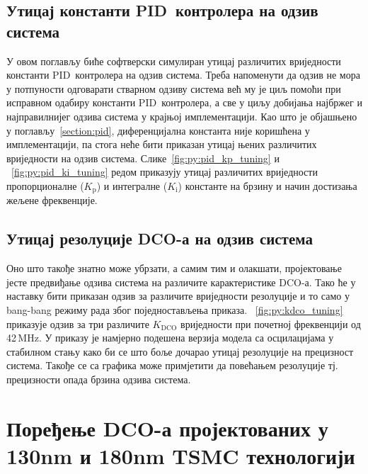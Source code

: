 \documentclass[master]{finthesis}
\def \DCO  {DCO} %
\def \PID  {PID} %
\begin{document}
\subsection{Утицај константи \PID\ контролера на одзив система} \label{section:python_model:pid_tuning}
У овом поглављу биће софтверски симулиран утицај различитих вриједности константи \PID\ контролера на одзив система. Треба напоменути да одзив не мора у потпуности одговарати стварном одзиву система већ му је циљ помоћи при исправном одабиру константи \PID\ контролера, а све у циљу добијања најбржег и најправилнијег одзива система у крајњој имплементацији. Као што је објашњено у поглављу~\ref{section:pid}, диференцијална константа није коришћена у имплементацији, па стога неће бити приказан утицај њених различитих вриједности на одзив система. Слике~\ref{fig:py:pid_kp_tuning} и ~\ref{fig:py:pid_ki_tuning} редом приказују утицај различитих вриједности пропорционалне ($K_\text{p}$) и интегралне ($K_\text{i}$) константе на брзину и начин достизања жељене фреквенције.



\subsection{Утицај резолуције \DCO-а на одзив система} \label{section:python_model:dco_tuning}
Оно што такође знатно може убрзати, а самим тим и олакшати, пројектовање јесте предвиђање одзива система на различите карактеристике \DCO-а. Тако ће у наставку бити приказан одзив за различите вриједности резолуције и то само у bang-bang режиму рада због поједностављења приказа. \figurename~\ref{fig:py:kdco_tuning} приказује одзив за три различите $K_\text{DCO}$ вриједности при почетној фреквенцији од 42\,MHz. У приказу је намјерно подешена верзија модела са осцилацијама у стабилном стању како би се што боље дочарао утицај резолуције на прецизност система. Такође се са графика може примјетити да повећањем резолуције тј. прецизности опада брзина одзива система. 







\section{Поређење \DCO-а пројектованих у 130nm и 180nm TSMC технологији} \label{section:compare}
\end{document}
